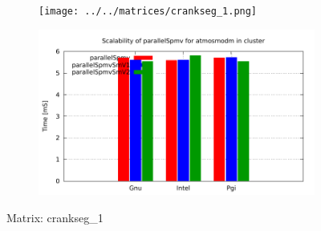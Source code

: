\begin{figure} [ht!]
    \centering
    \captionsetup{justification=centering, singlelinecheck=false}
    \begin{subfigure}{.65\textwidth}
      \centering
      \hspace*{-3.5cm} 
      \texttt{[image: ../../matrices/crankseg\_1.png]}
      \label{fig:crankseg_1_matrix}
    \end{subfigure}%
    \begin{subfigure}{.65\textwidth}
      \centering
      \hspace*{-6.0cm} 
      \includegraphics[page=2, width=0.95\linewidth]{../plots/myCluster_4-2.pdf}
      \label{fig:crankseg_1_performance}
    \end{subfigure}
\caption{Matrix: crankseg\_1}
\label{fig:crankseg_1}
\end{figure}

